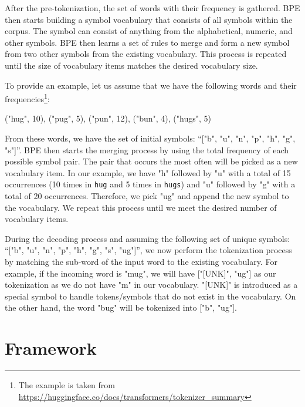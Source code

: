 After the pre-tokenization, the set of words with their frequency is gathered.
BPE then starts building a symbol vocabulary that consists of all symbols within the corpus. The symbol can consist of anything from the alphabetical, numeric, and other symbols. BPE then learns a set of rules to merge and form a new symbol from two other symbols from the existing vocabulary. This process is repeated until the size of vocabulary items matches the desired vocabulary size.

To provide an example, let us assume that we have the following words and their frequencies\footnote{The example is taken from \url{https://huggingface.co/docs/transformers/tokenizer_summary}}:

\bigskip
("hug", 10), ("pug", 5), ("pun", 12), ("bun", 4), ("hugs", 5)
\bigskip

From these words, we have the set of initial symbols: ``["b", "u", "n", "p", "h", "g", "s"]''. BPE then starts the merging process by using the total frequency of each possible symbol pair. The pair that occurs the most often will be picked as a new vocabulary item. In our example, we have "h" followed by "u" with a total of 15 occurrences (10 times in \texttt{hug} and 5 times in \texttt{hugs}) and "u" followed by "g" with a total of 20 occurrences. Therefore, we pick "ug" and append the new symbol to the vocabulary. We repeat this process until we meet the desired number of vocabulary items.

During the decoding process and assuming the following set of unique symbols: ``["b", "u", "n", "p", "h", "g", "s", "ug"]'', we now perform the tokenization process by matching the sub-word of the input word to the existing vocabulary. For example, if the incoming word is "mug", we will have ["[UNK]", "ug"] as our tokenization as we do not have "m" in our vocabulary. "[UNK]" is introduced as a special symbol to handle tokens/symbols that do not exist in the vocabulary. On the other hand, the word "bug" will be tokenized into ["b", "ug"].

\section{Framework}
\label{sec:framework}
